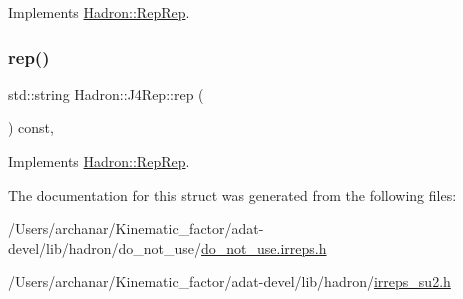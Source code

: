 Implements \mbox{\hyperlink{structHadron_1_1RepRep_ab3213025f6de249f7095892109575fde}{Hadron\+::\+Rep\+Rep}}.

\mbox{\label{structHadron_1_1J4Rep_a2dcdb2a04a0f8207e99fffb770037b9e}} 
\subsubsection{\texorpdfstring{rep()}{rep()}\hspace{0.1cm}{\footnotesize\ttfamily [5/5]}}
{\footnotesize\ttfamily std\+::string Hadron\+::\+J4\+Rep\+::rep (\begin{DoxyParamCaption}{ }\end{DoxyParamCaption}) const\hspace{0.3cm}{\ttfamily [inline]}, {\ttfamily [virtual]}}



Implements \mbox{\hyperlink{structHadron_1_1RepRep_ab3213025f6de249f7095892109575fde}{Hadron\+::\+Rep\+Rep}}.



The documentation for this struct was generated from the following files\+:\begin{DoxyCompactItemize}
\item 
/\+Users/archanar/\+Kinematic\+\_\+factor/adat-\/devel/lib/hadron/do\+\_\+not\+\_\+use/\mbox{\hyperlink{adat-devel_2lib_2hadron_2do__not__use_2do__not__use_8irreps_8h}{do\+\_\+not\+\_\+use.\+irreps.\+h}}\item 
/\+Users/archanar/\+Kinematic\+\_\+factor/adat-\/devel/lib/hadron/\mbox{\hyperlink{adat-devel_2lib_2hadron_2irreps__su2_8h}{irreps\+\_\+su2.\+h}}\end{DoxyCompactItemize}
